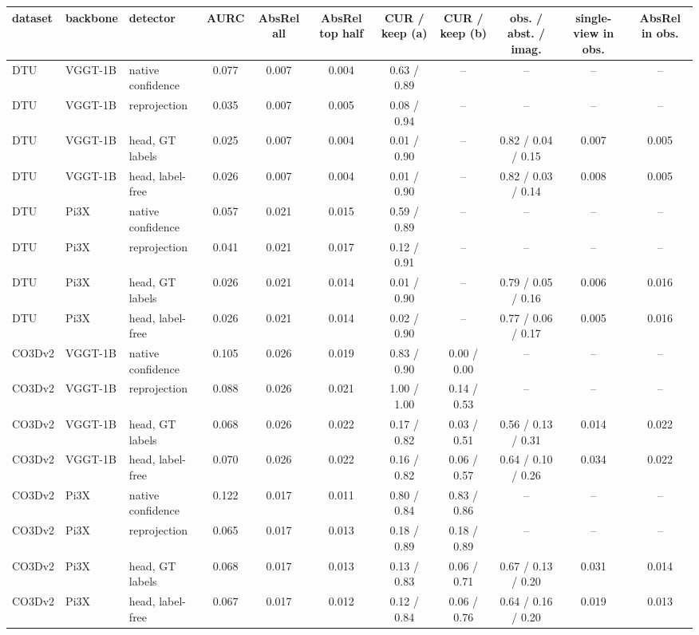 \begin{tabular}{lll*{8}{c}}
\toprule
dataset & backbone & detector & AURC & AbsRel all & AbsRel top half & CUR / keep (a) & CUR / keep (b) & obs. / abst. / imag. & single-view in obs. & AbsRel in obs. \\
\midrule
DTU & VGGT-1B & native confidence & 0.077 & 0.007 & 0.004 & 0.63 / 0.89 & -- & -- & -- & -- \\
DTU & VGGT-1B & reprojection & 0.035 & 0.007 & 0.005 & 0.08 / 0.94 & -- & -- & -- & -- \\
DTU & VGGT-1B & head, GT labels & 0.025 & 0.007 & 0.004 & 0.01 / 0.90 & -- & 0.82 / 0.04 / 0.15 & 0.007 & 0.005 \\
DTU & VGGT-1B & head, label-free & 0.026 & 0.007 & 0.004 & 0.01 / 0.90 & -- & 0.82 / 0.03 / 0.14 & 0.008 & 0.005 \\
DTU & Pi3X & native confidence & 0.057 & 0.021 & 0.015 & 0.59 / 0.89 & -- & -- & -- & -- \\
DTU & Pi3X & reprojection & 0.041 & 0.021 & 0.017 & 0.12 / 0.91 & -- & -- & -- & -- \\
DTU & Pi3X & head, GT labels & 0.026 & 0.021 & 0.014 & 0.01 / 0.90 & -- & 0.79 / 0.05 / 0.16 & 0.006 & 0.016 \\
DTU & Pi3X & head, label-free & 0.026 & 0.021 & 0.014 & 0.02 / 0.90 & -- & 0.77 / 0.06 / 0.17 & 0.005 & 0.016 \\
CO3Dv2 & VGGT-1B & native confidence & 0.105 & 0.026 & 0.019 & 0.83 / 0.90 & 0.00 / 0.00 & -- & -- & -- \\
CO3Dv2 & VGGT-1B & reprojection & 0.088 & 0.026 & 0.021 & 1.00 / 1.00 & 0.14 / 0.53 & -- & -- & -- \\
CO3Dv2 & VGGT-1B & head, GT labels & 0.068 & 0.026 & 0.022 & 0.17 / 0.82 & 0.03 / 0.51 & 0.56 / 0.13 / 0.31 & 0.014 & 0.022 \\
CO3Dv2 & VGGT-1B & head, label-free & 0.070 & 0.026 & 0.022 & 0.16 / 0.82 & 0.06 / 0.57 & 0.64 / 0.10 / 0.26 & 0.034 & 0.022 \\
CO3Dv2 & Pi3X & native confidence & 0.122 & 0.017 & 0.011 & 0.80 / 0.84 & 0.83 / 0.86 & -- & -- & -- \\
CO3Dv2 & Pi3X & reprojection & 0.065 & 0.017 & 0.013 & 0.18 / 0.89 & 0.18 / 0.89 & -- & -- & -- \\
CO3Dv2 & Pi3X & head, GT labels & 0.068 & 0.017 & 0.013 & 0.13 / 0.83 & 0.06 / 0.71 & 0.67 / 0.13 / 0.20 & 0.031 & 0.014 \\
CO3Dv2 & Pi3X & head, label-free & 0.067 & 0.017 & 0.012 & 0.12 / 0.84 & 0.06 / 0.76 & 0.64 / 0.16 / 0.20 & 0.019 & 0.013 \\

\end{tabular}
